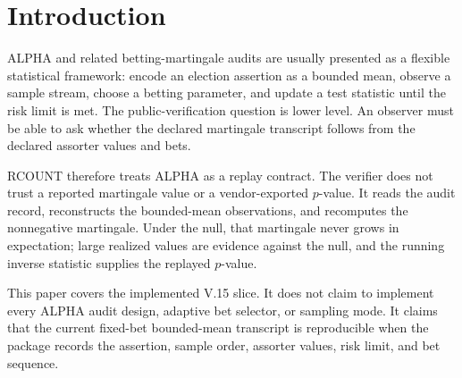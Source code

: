 \section{Introduction}

ALPHA and related betting-martingale audits are usually presented as a flexible
statistical framework: encode an election assertion as a bounded mean, observe a
sample stream, choose a betting parameter, and update a test statistic until the
risk limit is met. The public-verification question is lower level. An observer
must be able to ask whether the declared martingale transcript follows from the
declared assorter values and bets.

RCOUNT therefore treats ALPHA as a replay contract. The verifier does not trust
a reported martingale value or a vendor-exported $p$-value. It reads the audit
record, reconstructs the bounded-mean observations, and recomputes the
nonnegative martingale. Under the null, that martingale never grows in
expectation; large realized values are evidence against the null, and the
running inverse statistic supplies the replayed $p$-value.

This paper covers the implemented V.15 slice. It does not claim to implement
every ALPHA audit design, adaptive bet selector, or sampling mode. It claims
that the current fixed-bet bounded-mean transcript is reproducible when the
package records the assertion, sample order, assorter values, risk limit, and
bet sequence.
